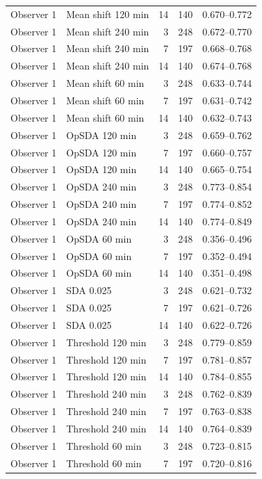 \documentclass[a4paper,11pt]{article}
\begin{document}
{\begin{longtable}[]{@{}llrrl@{}}
Observer 1 & Mean shift 120 min & 14 & 140 & 0.670--0.772 \\
Observer 1 & Mean shift 240 min & 3 & 248 & 0.672--0.770 \\
Observer 1 & Mean shift 240 min & 7 & 197 & 0.668--0.768 \\
Observer 1 & Mean shift 240 min & 14 & 140 & 0.674--0.768 \\
Observer 1 & Mean shift 60 min & 3 & 248 & 0.633--0.744 \\
Observer 1 & Mean shift 60 min & 7 & 197 & 0.631--0.742 \\
Observer 1 & Mean shift 60 min & 14 & 140 & 0.632--0.743 \\
Observer 1 & OpSDA 120 min & 3 & 248 & 0.659--0.762 \\
Observer 1 & OpSDA 120 min & 7 & 197 & 0.660--0.757 \\
Observer 1 & OpSDA 120 min & 14 & 140 & 0.665--0.754 \\
Observer 1 & OpSDA 240 min & 3 & 248 & 0.773--0.854 \\
Observer 1 & OpSDA 240 min & 7 & 197 & 0.774--0.852 \\
Observer 1 & OpSDA 240 min & 14 & 140 & 0.774--0.849 \\
Observer 1 & OpSDA 60 min & 3 & 248 & 0.356--0.496 \\
Observer 1 & OpSDA 60 min & 7 & 197 & 0.352--0.494 \\
Observer 1 & OpSDA 60 min & 14 & 140 & 0.351--0.498 \\
Observer 1 & SDA 0.025 & 3 & 248 & 0.621--0.732 \\
Observer 1 & SDA 0.025 & 7 & 197 & 0.621--0.726 \\
Observer 1 & SDA 0.025 & 14 & 140 & 0.622--0.726 \\
Observer 1 & Threshold 120 min & 3 & 248 & 0.779--0.859 \\
Observer 1 & Threshold 120 min & 7 & 197 & 0.781--0.857 \\
Observer 1 & Threshold 120 min & 14 & 140 & 0.784--0.855 \\
Observer 1 & Threshold 240 min & 3 & 248 & 0.762--0.839 \\
Observer 1 & Threshold 240 min & 7 & 197 & 0.763--0.838 \\
Observer 1 & Threshold 240 min & 14 & 140 & 0.764--0.839 \\
Observer 1 & Threshold 60 min & 3 & 248 & 0.723--0.815 \\
Observer 1 & Threshold 60 min & 7 & 197 & 0.720--0.816 \\

\end{longtable}}
\end{document}
